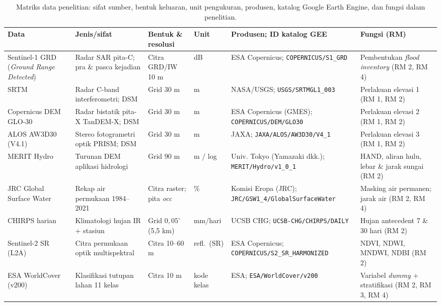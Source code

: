 \documentclass[12pt]{article}
\begin{document}
\begin{table}[ht]
\centering
\caption{Matriks data penelitian: sifat sumber, bentuk keluaran, unit
pengukuran, produsen, katalog Google Earth Engine, dan fungsi dalam
penelitian.}
\label{tab:data}
\small
\begin{adjustbox}{max width=\textwidth}
\begin{tabular}{>{\raggedright}p{2.5cm}>{\raggedright}p{2.5cm}>{\raggedright}p{1.55cm}>{\raggedright}p{1.4cm}>{\raggedright}p{3.55cm}>{\raggedright\arraybackslash}p{2.2cm}}
\toprule
\textbf{Data} & \textbf{Jenis/sifat} & \textbf{Bentuk \& resolusi} & \textbf{Unit} & \textbf{Produsen; ID katalog GEE} & \textbf{Fungsi (RM)} \\
\midrule
Sentinel-1 GRD (\textit{Ground Range Detected}) & Radar SAR pita-C; pra \& pasca kejadian & Citra GRD/IW 10 m & dB & ESA Copernicus; \texttt{COPERNICUS/\allowbreak S1\_GRD} & Pembentukan \textit{flood inventory} (RM 2, RM 4) \\
SRTM & Radar C-band interferometri; DSM & Grid 30 m & m & NASA/USGS; \texttt{USGS/\allowbreak SRTMGL1\_003} & Perlakuan elevasi 1 (RM 1, RM 2) \\
Copernicus DEM GLO-30 & Radar bistatik pita-X TanDEM-X; DSM & Grid 30 m & m & ESA Copernicus (GMES); \texttt{COPERNICUS/\allowbreak DEM/\allowbreak GLO30} & Perlakuan elevasi 2 (RM 1, RM 2) \\
ALOS AW3D30 (V4.1) & Stereo fotogrametri optik PRISM; DSM & Grid 30 m & m & JAXA; \texttt{JAXA/\allowbreak ALOS/\allowbreak AW3D30/\allowbreak V4\_1} & Perlakuan elevasi 3 (RM 1, RM 2) \\
MERIT Hydro & Turunan DEM aplikasi hidrologi & Grid 90 m & m / log & Univ. Tokyo (Yamazaki dkk.); \texttt{MERIT/\allowbreak Hydro/\allowbreak v1\_0\_1} & HAND, aliran hulu, lebar \& jarak sungai (RM 2) \\
JRC Global Surface Water & Rekap air permukaan 1984--2021 & Citra raster; pita \textit{occ} & \% & Komisi Eropa (JRC); \texttt{JRC/\allowbreak GSW1\_4/\allowbreak GlobalSurfaceWater} & Masking air permanen; jarak air (RM 2, RM 4) \\
CHIRPS harian & Klimatologi hujan IR + stasiun & Grid $0{,}05^{\circ}$ (5,5 km) & mm/hari & UCSB CHG; \texttt{UCSB-CHG/\allowbreak CHIRPS/\allowbreak DAILY} & Hujan antecedent 7 \& 30 hari (RM 2) \\
Sentinel-2 SR (L2A) & Citra permukaan optik multispektral & Citra 10--60 m & refl.\ (SR) & ESA Copernicus; \texttt{COPERNICUS/\allowbreak S2\_SR\_HARMONIZED} & NDVI, NDWI, MNDWI, NDBI (RM 2) \\
ESA WorldCover (v200) & Klasifikasi tutupan lahan 11 kelas & Citra 10 m & kode kelas & ESA; \texttt{ESA/\allowbreak WorldCover/\allowbreak v200} & Variabel \textit{dummy} + stratifikasi (RM 2, RM 3, RM 4) \\
\bottomrule
\end{tabular}
\end{adjustbox}
\end{table}
\end{document}
